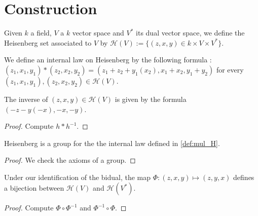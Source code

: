 \section{Construction}

\begin{definition}
    \label{def:heisenberg}
    \leanok

    Given $k$ a field, $V$ a $k$ vector space and $V^*$ its dual vector space,
    we define the Heisenberg set associated to $V$ by
    $\mathcal{H}(V):=\{(z,x,y) \in k\times V\times V^*\}$.
\end{definition}

\begin{definition}
    \label{def:mul_H}
    \leanok 

    We define an internal law on Heisenberg by the following formula :
    $(z_1,x_1,y_1)*(z_2,x_2,y_2) = (z_1+z_2+y_1(x_2),x_1+x_2,y_1+y_2)$ for every
     $(z_1,x_1,y_1),(z_2,x_2,y_2)\in\mathcal{H}(V)$.
\end{definition}

\begin{definition}
    \label{def:inv_H}
    \leanok 

    The inverse of $(z,x,y)\in\mathcal{H}(V)$ is given by the formula
    $(-z- y(-x), - x ,- y)$.
    \begin{proof}
        \leanok 
        Compute $h*h^{-1}$.
    \end{proof}
\end{definition}

\begin{proposition}
    \label{prop:group_H}
    \leanok
    Heisenberg is a group for the the internal law defined in \ref{def:mul_H}.
    \begin{proof}
        \leanok
        We check the axioms of a group.
    \end{proof}
\end{proposition}

\begin{definition}
    \label{def:bij_H}
    \leanok 

    Under our identification of the bidual, the map
    $\Phi : (z,x,y) \mapsto (z,y,x)$ defines a bijection 
    between $\mathcal{H}(V)$ and $\mathcal{H}(V^*)$.
    \begin{proof}
        \leanok
        Compute $\Phi\circ\Phi^{-1}$ and $\Phi^{-1}\circ\Phi$.
    \end{proof}
\end{definition}

